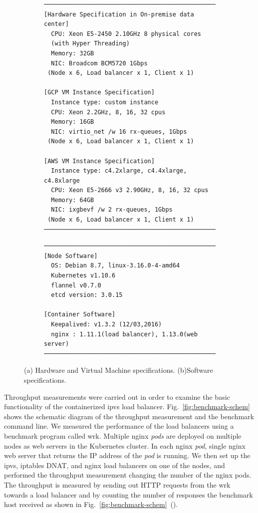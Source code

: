 \begin{figure}[tb]

  \begin{subfigure}[t]{\columnwidth}
\begin{Verbatim}[commandchars=\\\{\}]
───────────────────────────────────────────────────────
[Hardware Specification in On-premise data center]
  CPU: Xeon E5-2450 2.10GHz 8 physical cores
  (with Hyper Threading) 
  Memory: 32GB
  NIC: Broadcom BCM5720 1Gbps
 (Node x 6, Load balancer x 1, Client x 1)

[GCP VM Instance Specification]
  Instance type: custom instance
  CPU: Xeon 2.2GHz, 8, 16, 32 cpus
  Memory: 16GB
  NIC: virtio_net /w 16 rx-queues, 1Gbps
 (Node x 6, Load balancer x 1, Client x 1)

[AWS VM Instance Specification]
  Instance type: c4.2xlarge, c4.4xlarge, c4.8xlarge 
  CPU: Xeon E5-2666 v3 2.90GHz, 8, 16, 32 cpus
  Memory: 64GB
  NIC: ixgbevf /w 2 rx-queues, 1Gbps
 (Node x 6, Load balancer x 1, Client x 1)
───────────────────────────────────────────────────────
\end{Verbatim}
    \caption{}
    \label{fig:machine_spec}
  \end{subfigure}

  \begin{subfigure}[t]{\columnwidth}
\begin{Verbatim}[commandchars=\\\{\}]
───────────────────────────────────────────────────────
[Node Software]
  OS: Debian 8.7, linux-3.16.0-4-amd64
  Kubernetes v1.10.6
  flannel v0.7.0
  etcd version: 3.0.15

[Container Software]
  Keepalived: v1.3.2 (12/03,2016)
  nginx : 1.11.1(load balancer), 1.13.0(web server) 
───────────────────────────────────────────────────────
\end{Verbatim}
    \caption{}
    \label{fig:software_spec}
  \end{subfigure}

  \caption{
    (a) Hardware and Virtual Machine specifications. (b)Software specifications.
  }
  \label{fig:benchmark-spec}
\end{figure}

Throughput measurements were carried out in order to examine the basic functionality of the containerized ipvs load balancer.
Fig.~\ref{fig:benchmark-schem} shows the schematic diagram of the throughput measurement and the benchmark command line.
We measured the performance of the load balancers using a benchmark program called wrk\cite{Glozer2016}.
Multiple nginx {\em pods} are deployed on multiple nodes as web servers in the Kubernetes cluster.
In each nginx {\em pod}, single nginx web server that returns the IP address of the {\em pod} is running.
We then set up the ipvs, iptables DNAT, and nginx load balancers on one of the nodes, and performed the throughput measurement changing the number of the nginx pods.
The throughput is measured by sending out HTTP requests from the wrk towards a load balancer and by counting the number of responses the benchmark host received as shown in Fig.~\ref{fig:benchmark-schem}~().


